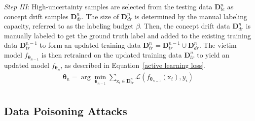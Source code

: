 \documentclass[conference,compsoc]{IEEEtran} %
\begin{document}
\emph{Step III}: High-uncertainty samples are selected from the testing data $\bm{D}_{te}^{n}$ as concept drift samples $\bm{D}_{dr}^{n}$.
	The size of $\bm{D}_{dr}^{n}$ is determined by the manual labeling capacity, referred to as the labeling budget $\beta$.
	Then, the concept drift data $\bm{D}_{dr}^{n}$ is manually labeled to get the ground truth label and added to the existing training data $\bm{D}^{n-1}_{tr}$ to form an updated training data $\bm{D}^{n}_{tr} = \bm{D}_{tr}^{n-1} \cup \bm{D}_{dr}^{n}$.
	The victim model $f_{\bm{\theta}_{n-1}}$ is then retrained on the updated training data $\bm{D}^{n}_{tr}$ to yield an updated model $f_{\bm{\theta}_{n}}$, as described in Equation~\ref{active learning loss}.
	\begin{equation}
		\begin{aligned}
			\bm{\theta}_{n} = \arg\min_{\bm{\theta}_{n-1}} \sum_{\bm{\mathrm{x}}_{i} \in \bm{D}^{n}_{tr}} \mathcal{L} \left( f_{\bm{\theta}_{n-1}}\left( \bm{\mathrm{x}}_{i}\right) , y_{i}  \right) \\
		\end{aligned}
		\label{active learning loss}
	\end{equation}




\subsection{Data Poisoning Attacks}
\label{Sec: Data Poisoning Attacks}
\end{document}
